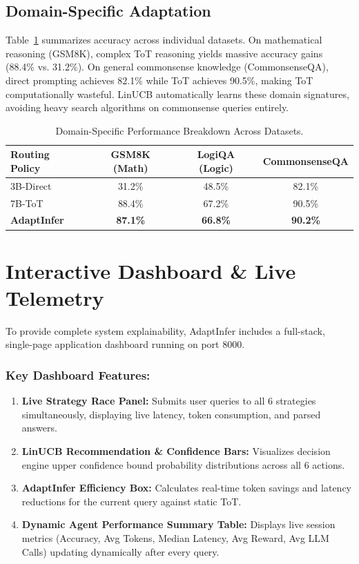 \documentclass[pdflatex,sn-mathphys-num]{sn-jnl}%
\theoremstyle{thmstyleone}%
\theoremstyle{thmstyletwo}%
\theoremstyle{thmstylethree}%
\begin{document}
\subsection{Domain-Specific Adaptation}
Table~\ref{tab:domain_breakdown} summarizes accuracy across individual datasets. On mathematical reasoning (GSM8K), complex ToT reasoning yields massive accuracy gains (88.4\% vs. 31.2\%). On general commonsense knowledge (CommonsenseQA), direct prompting achieves 82.1\% while ToT achieves 90.5\%, making ToT computationally wasteful. LinUCB automatically learns these domain signatures, avoiding heavy search algorithms on commonsense queries entirely.

\begin{table}[htbp]
\centering
\caption{Domain-Specific Performance Breakdown Across Datasets.}
\label{tab:domain_breakdown}
\begin{tabular}{lccc}
\toprule
\textbf{Routing Policy} & \textbf{GSM8K (Math)} & \textbf{LogiQA (Logic)} & \textbf{CommonsenseQA} \\
\midrule
3B-Direct & 31.2\% & 48.5\% & 82.1\% \\
7B-ToT & 88.4\% & 67.2\% & 90.5\% \\
\textbf{AdaptInfer} & \textbf{87.1\%} & \textbf{66.8\%} & \textbf{90.2\%} \\
\bottomrule
\end{tabular}
\end{table}

\section{Interactive Dashboard \& Live Telemetry}\label{sec5}

To provide complete system explainability, AdaptInfer includes a full-stack, single-page application dashboard running on port 8000.

\subsubsection{Key Dashboard Features:}
\begin{enumerate}
    \item \textbf{Live Strategy Race Panel:} Submits user queries to all 6 strategies simultaneously, displaying live latency, token consumption, and parsed answers.
    \item \textbf{LinUCB Recommendation \& Confidence Bars:} Visualizes decision engine upper confidence bound probability distributions across all 6 actions.
    \item \textbf{AdaptInfer Efficiency Box:} Calculates real-time token savings and latency reductions for the current query against static ToT.
    \item \textbf{Dynamic Agent Performance Summary Table:} Displays live session metrics (Accuracy, Avg Tokens, Median Latency, Avg Reward, Avg LLM Calls) updating dynamically after every query.
\end{enumerate}
\end{document}
